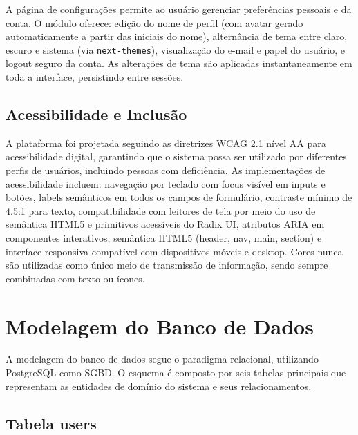 \documentclass[a4paper,12pt,oneside]{article}
\begin{document}
A página de configurações permite ao usuário gerenciar preferências pessoais e da conta. O módulo oferece: edição do nome de perfil (com avatar gerado automaticamente a partir das iniciais do nome), alternância de tema entre claro, escuro e sistema (via \texttt{next-themes}), visualização do e-mail e papel do usuário, e logout seguro da conta. As alterações de tema são aplicadas instantaneamente em toda a interface, persistindo entre sessões.

\subsection{Acessibilidade e Inclusão}

A plataforma foi projetada seguindo as diretrizes WCAG 2.1 nível AA para acessibilidade digital, garantindo que o sistema possa ser utilizado por diferentes perfis de usuários, incluindo pessoas com deficiência. As implementações de acessibilidade incluem: navegação por teclado com focus visível em inputs e botões, labels semânticos em todos os campos de formulário, contraste mínimo de 4.5:1 para texto, compatibilidade com leitores de tela por meio do uso de semântica HTML5 e primitivos acessíveis do Radix UI, atributos ARIA em componentes interativos, semântica HTML5 (header, nav, main, section) e interface responsiva compatível com dispositivos móveis e desktop. Cores nunca são utilizadas como único meio de transmissão de informação, sendo sempre combinadas com texto ou ícones.

\section{Modelagem do Banco de Dados}

A modelagem do banco de dados segue o paradigma relacional, utilizando PostgreSQL como SGBD. O esquema é composto por seis tabelas principais que representam as entidades de domínio do sistema e seus relacionamentos.

\subsection{Tabela users}
\end{document}

